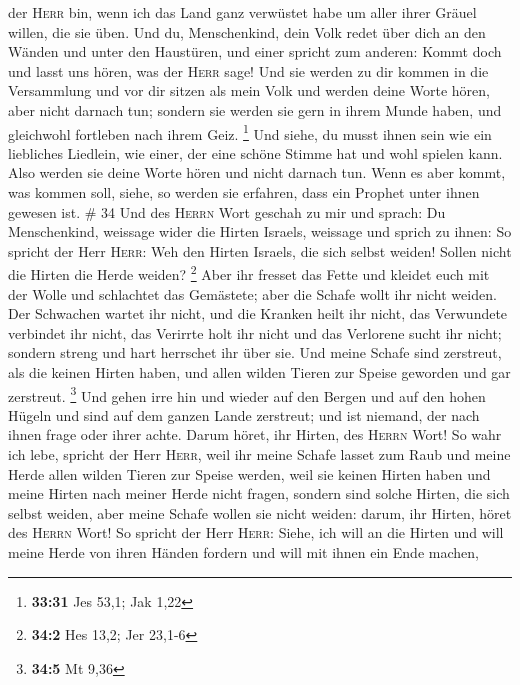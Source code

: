 der \textsc{Herr} bin, wenn ich das Land ganz verwüstet habe um aller
ihrer Gräuel willen, die sie üben.  Und du, Menschenkind,
dein Volk redet über dich an den Wänden und unter den Haustüren, und
einer spricht zum anderen: Kommt doch und lasst uns hören, was der
\textsc{Herr} sage!  Und sie werden zu dir kommen in die
Versammlung und vor dir sitzen als mein Volk und werden deine Worte
hören, aber nicht darnach tun; sondern sie werden sie gern in ihrem
Munde haben, und gleichwohl fortleben nach ihrem Geiz. \footnote{\textbf{33:31}
  Jes 53,1; Jak 1,22}  Und siehe, du musst ihnen sein wie
ein liebliches Liedlein, wie einer, der eine schöne Stimme hat und wohl
spielen kann. Also werden sie deine Worte hören und nicht darnach tun.
 Wenn es aber kommt, was kommen soll, siehe, so werden
sie erfahren, dass ein Prophet unter ihnen gewesen ist. \# 34
 Und des \textsc{Herrn} Wort geschah zu mir und sprach:
 Du Menschenkind, weissage wider die Hirten Israels,
weissage und sprich zu ihnen: So spricht der Herr \textsc{Herr}: Weh den
Hirten Israels, die sich selbst weiden! Sollen nicht die Hirten die
Herde weiden? \footnote{\textbf{34:2} Hes 13,2; Jer 23,1-6}
 Aber ihr fresset das Fette und kleidet euch mit der Wolle
und schlachtet das Gemästete; aber die Schafe wollt ihr nicht weiden.
 Der Schwachen wartet ihr nicht, und die Kranken heilt ihr
nicht, das Verwundete verbindet ihr nicht, das Verirrte holt ihr nicht
und das Verlorene sucht ihr nicht; sondern streng und hart herrschet ihr
über sie.  Und meine Schafe sind zerstreut, als die keinen
Hirten haben, und allen wilden Tieren zur Speise geworden und gar
zerstreut. \footnote{\textbf{34:5} Mt 9,36}  Und gehen
irre hin und wieder auf den Bergen und auf den hohen Hügeln und sind auf
dem ganzen Lande zerstreut; und ist niemand, der nach ihnen frage oder
ihrer achte.  Darum höret, ihr Hirten, des \textsc{Herrn}
Wort!  So wahr ich lebe, spricht der Herr \textsc{Herr},
weil ihr meine Schafe lasset zum Raub und meine Herde allen wilden
Tieren zur Speise werden, weil sie keinen Hirten haben und meine Hirten
nach meiner Herde nicht fragen, sondern sind solche Hirten, die sich
selbst weiden, aber meine Schafe wollen sie nicht weiden: 
darum, ihr Hirten, höret des \textsc{Herrn} Wort!  So
spricht der Herr \textsc{Herr}: Siehe, ich will an die Hirten und will
meine Herde von ihren Händen fordern und will mit ihnen ein Ende machen,
